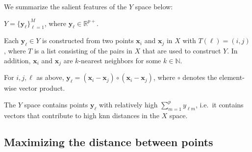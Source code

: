 \documentclass[letter,12pt]{article}
\begin{document}
We summarize the salient features of the $Y$ space below:
\begin{compactenum}
	\item $Y = \{\bm{y}_\ell \}_{\ell=1}^M$, where $\bm{y}_\ell \in \mathbb{R}^{p+}$.
	\item Each $\bm{y}_\ell \in Y$ is constructed from two points $\bm{x}_i$ and $\bm{x}_j$ in $X$ with $T(\ell) = (i,j)$, where $T$ is a list consisting of the pairs in $X$ that are used to construct $Y$. In addition, $\bm{x}_i$ and $\bm{x}_j$ are $k$-nearest neighbors for some { \color{blue} $k \in \mathbb{N}$}.
	\item For $i,j,\ell$ as above, $\bm{y}_\ell = (\bm{x}_i - \bm{x}_j) \circ (\bm{x}_i - \bm{x}_j) $, where $\circ$ denotes the element-wise vector product.
	\item The $Y$ space contains points $\bm{y}_\ell$ with relatively high $\sum_{m=1}^p y_{\ell m}$, i.e.\ it contains vectors that contribute to high knn distances in the $X$ space.
\end{compactenum}

\subsection{Maximizing the distance between points}\label{sec:MathFrame2}
\end{document}
